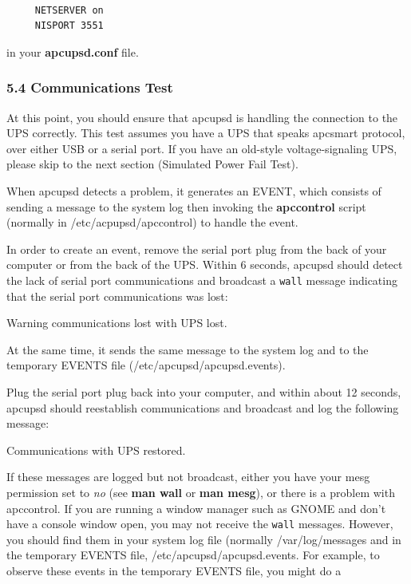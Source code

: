 {{\footnotesize
\begin{verbatim}
     
     NETSERVER on
     NISPORT 3551
\end{verbatim}
\normalsize

in your {\bf apcupsd.conf} file. 

\label{Communications-Test}

\subsubsection*{5.4 Communications Test}

\label{index-Testing_002c-Communications-91}
\label{index-Communications-Testing-92}
At this point, you should ensure that apcupsd is handling the connection to
the UPS correctly. This test assumes you have a UPS that speaks apcsmart
protocol, over either USB or a serial port.  If you have an old-style
voltage-signaling UPS, please skip to the next section (Simulated Power Fail
Test).  

When apcupsd detects a problem, it generates an EVENT, which consists of
sending a message to the system log then invoking the {\bf apccontrol} script
(normally in /etc/acpupsd/apccontrol) to handle the event.  

In order to create an event, remove the serial port plug from the back of your
computer or from the back of the UPS. Within 6 seconds, apcupsd should detect
the lack of serial port communications and broadcast a {\tt wall} message
indicating that the serial port communications was lost:  

Warning communications lost with UPS lost.  

At the same time, it sends the same message to the system log and to the
temporary EVENTS file (/etc/apcupsd/apcupsd.events).  

Plug the serial port plug back into your computer, and within about 12
seconds, apcupsd should reestablish communications and broadcast and log the
following message:  

Communications with UPS restored.  

If these messages are logged but not broadcast, either you have your mesg
permission set to {\it no} (see {\bf man wall} or {\bf man mesg}), or there is
a problem with apccontrol. If you are running a window manager such as GNOME
and don't have a console window open, you may not receive the {\tt wall}
messages. However, you should find them in your system log file (normally
/var/log/messages and in the temporary EVENTS file,
/etc/apcupsd/apcupsd.events. For example, to observe these events in the
temporary EVENTS file, you might do a 

}}
